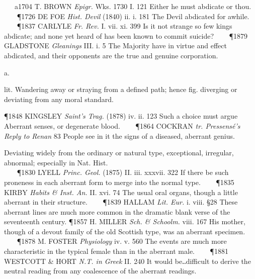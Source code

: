 \begin{description}[wide, labelwidth=!, labelindent=0pt]
\begin{myenumerate}
   a1704 T. BROWN \textit{Epigr.} Wks. 1730 I. 121 Either he must abdicate 
or thou.    
\P 1726 DE FOE \textit{Hist. Devil} (1840) ii. i. 181 The Devil abdicated 
for awhile.    
\P 1837 CARLYLE \textit{Fr. Rev.} I. vii. xi. 399 Is it not strange so few 
kings abdicate; and none yet heard of has been known to commit suicide?    
\P 1879 GLADSTONE \textit{Gleanings} III. i. 5 The Majority have in virtue 
and effect abdicated, and their opponents are the true and genuine corporation.
\end{myenumerate}






 a. 

\noindent {}

\vspace{-0.3cm}

\begin{myenumerate}

 lit. Wandering away or straying from a defined path; hence fig. diverging or
deviating from any moral standard. 

\P 1848 KINGSLEY \textit{Saint's Trag.} (1878) iv. ii. 123 Such a choice must argue
Aberrant senses, or degenerate blood.    
\P 1864 COCKRAN \textit{tr. Pressensé's Reply to Renan} 83 People see in it the signs 
of a diseased, aberrant genius.

 Deviating widely from the ordinary or natural type, exceptional, irregular,
abnormal; especially in Nat. Hist.  \vspace{0.2cm} \\ 
   
\P 1830 LYELL \textit{Princ. Geol.} (1875) II. iii. xxxvii. 322 If there be such
proneness in each aberrant form to merge into the normal type.    
\P 1835 KIRBY \textit{Habits \& Inst. An.} II. xvi. 74 The usual oral organs, though a little aberrant
in their structure.    
\P 1839 HALLAM \textit{Lit. Eur.} i. viii. §28 These aberrant lines
are much more common in the dramatic blank verse of the seventeenth century.
\P 1857 H. MILLER \textit{Sch. \& Schoolm.} viii. 167 His mother, though of a devout
family of the old Scottish type, was an aberrant specimen.    
\P 1878 M. FOSTER \textit{Physiology} iv. v. 560 The events are much more characteristic in the typical
female than in the aberrant male.    
\P 1881 WESTCOTT \& HORT \textit{N.T. in Greek} II. 240
It would be‥difficult to derive the neutral reading from any coalescence of the
aberrant readings.


\end{myenumerate}
\end{description}
